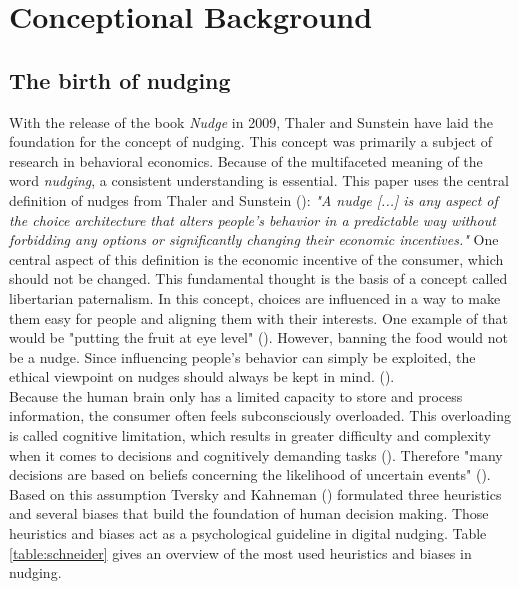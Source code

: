\section{Conceptional Background}

\subsection{ The birth of nudging}
With the release of the book \textit{Nudge} in 2009, Thaler and Sunstein have laid the foundation for the concept of nudging. This concept was primarily a subject of research in behavioral economics. Because of the multifaceted meaning of the word \textit{nudging}, a consistent understanding is essential. This paper uses the central definition of nudges from Thaler and Sunstein (\citeyear[p.6]{thaler_nudge:_2009}): \textit{"A nudge [...] is any aspect of the choice architecture that alters people's behavior in a predictable way without forbidding any options or significantly changing their economic incentives."}
One central aspect of this definition is the economic incentive of the consumer, which should not be changed. This fundamental thought is the basis of a concept called libertarian paternalism. In this concept, choices are influenced in a way to make them easy for people and aligning them with their interests. One example of that would be "putting the fruit at eye level" (\cite[p.6]{thaler_nudge:_2009}). However, banning the food would not be a nudge. Since influencing people's behavior can simply be exploited, the ethical viewpoint on nudges should always be kept in mind. (\cite{sunstein_nudging_2015}).
\\

Because the human brain only has a limited capacity to store and process information, the consumer often feels subconsciously overloaded. This overloading is called cognitive limitation, which results in greater difficulty and complexity when it comes to decisions and cognitively demanding tasks (\cite{broniarczyk_decision_2014}). Therefore "many decisions are based on beliefs concerning the likelihood of uncertain events" (\cite[p.1124]{tversky_judgment_1974}). Based on this assumption Tversky and Kahneman (\citeyear{tversky_judgment_1974}) formulated three heuristics and several biases that build the foundation of human decision making. Those heuristics and biases act as a psychological guideline in digital nudging. Table \ref{table:schneider} gives an overview of the most used heuristics and biases in nudging.
\\

